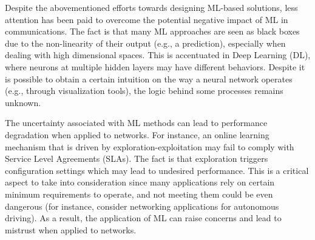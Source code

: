 \documentclass[journal]{IEEEtran}
\begin{document}
	Despite the abovementioned efforts towards designing ML-based solutions, less attention has been paid to overcome the potential negative impact of ML in communications. The fact is that many ML approaches are seen as black boxes due to the non-linearity of their output (e.g., a prediction), especially when dealing with high dimensional spaces. This is accentuated in Deep Learning (DL), where neurons at multiple hidden layers may have different behaviors. Despite it is possible to obtain a certain intuition on the way a neural network operates (e.g., through visualization tools), the logic behind some processes remains unknown.
	
	The uncertainty associated with ML methods can lead to performance degradation when applied to networks. For instance, an online learning mechanism that is driven by exploration-exploitation may fail to comply with Service Level Agreements (SLAs). The fact is that exploration triggers configuration settings which may lead to undesired performance. This is a critical aspect to take into consideration since many applications rely on certain minimum requirements to operate, and not meeting them could be even dangerous (for instance, consider networking applications for autonomous driving). As a result, the application of ML can raise concerns and lead to mistrust when applied to networks.
	
\end{document}
